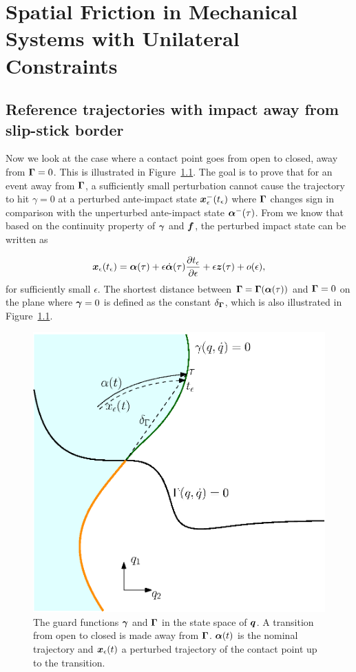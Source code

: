 \documentclass[../DC2017114Bouma.tex]{subfiles}
\begin{document}
\cleartooddpage
\chapter{Spatial Friction in Mechanical Systems with Unilateral Constraints}
\section{Reference trajectories with impact away from slip-stick border}\label{app:impactsaway}
Now we look at the case where a contact point goes from open to closed, away from $\boldsymbol{\Gamma} = 0$. This is illustrated in Figure~\ref{fig:impactfromborder}. The goal is to prove that for an event away from $\boldsymbol{\Gamma}$, a sufficiently small perturbation cannot cause the trajectory to hit $\gamma = 0$ at a perturbed ante-impact state ${\boldsymbol{x}}_\epsilon^-(t_\epsilon)$ where $\boldsymbol{\Gamma}$ changes sign in comparison with the unperturbed ante-impact state $\boldsymbol{\alpha}^-(\tau)$. From \cite[p. 6]{Rijnen2018} we know that based on the continuity property of $\boldsymbol{\gamma}$ and ${\boldsymbol{f}}$, the perturbed impact state can be written as

\begin{align}
{\boldsymbol{x}}_\epsilon(t_\epsilon) = \boldsymbol{\alpha}(\tau) + \epsilon\dot{\boldsymbol{\alpha}}(\tau)\frac{\partial t_\epsilon}{\partial \epsilon} + \epsilon{\boldsymbol{z}}(\tau) + o(\epsilon),\label{eq:appxpert}
\end{align}
for sufficiently small $\epsilon$. The shortest distance between $\boldsymbol{\Gamma} = \boldsymbol{\Gamma}(\boldsymbol{\alpha}(\tau))$ and $\boldsymbol{\Gamma} = 0$ on the plane where $\boldsymbol{\gamma} = 0$ is defined as the constant $\delta_{\boldsymbol{\Gamma}}$, which is also illustrated in Figure~\ref{fig:impactfromborder}.

\begin{figure}[h]
\centering
\includegraphics[width=.5\textwidth,trim={0cm 2.5cm 2cm 2.4cm},clip]{impactfromborder.eps}\caption{The guard functions $\boldsymbol{\gamma}$ and $\boldsymbol{\Gamma}$ in the state space of ${\boldsymbol{q}}$. A transition from open to closed is made away from $\boldsymbol{\Gamma}$. $\boldsymbol{\alpha}(t)$ is the nominal trajectory and ${\boldsymbol{x}}_\epsilon(t)$ a perturbed trajectory of the contact point up to the transition.} \label{fig:impactfromborder}
\end{figure}
\end{document}
